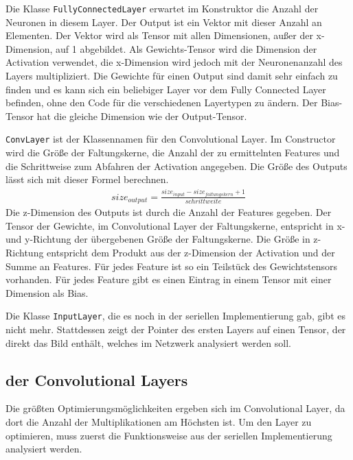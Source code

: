 \documentclass[../main.tex]{subfiles}
\begin{document}
Die Klasse \texttt{FullyConnectedLayer} erwartet im Konstruktor die Anzahl der Neuronen in diesem Layer. Der Output ist ein Vektor mit dieser Anzahl an Elementen. Der Vektor wird als Tensor mit allen Dimensionen, außer der x-Dimension, auf 1 abgebildet. Als Gewichts-Tensor wird die Dimension der Activation verwendet, die x-Dimension wird jedoch mit der Neuronenanzahl des Layers multipliziert. Die Gewichte für einen Output sind damit sehr einfach zu finden und es kann sich ein beliebiger Layer vor dem Fully Connected Layer befinden, ohne den Code für die verschiedenen Layertypen zu ändern. Der Bias-Tensor hat die gleiche Dimension wie der Output-Tensor.

\texttt{ConvLayer} ist der Klassennamen für den Convolutional Layer. Im Constructor wird die Größe der Faltungskerne, die Anzahl der zu ermittelnten Features und die Schrittweise zum Abfahren der Activation angegeben. Die Größe des Outputs lässt sich mit dieser Formel berechnen.
\begin{equation}\label{eq:cnn_outout_size}
\begin{split}
size_{output} = \frac{size_{input} -size_{faltungskern} +1}{schrittweite}
\end{split}
\end{equation}
Die z-Dimension des Outputs ist durch die Anzahl der Features gegeben. Der Tensor der Gewichte, im Convolutional Layer der Faltungskerne, entspricht in x- und y-Richtung der übergebenen Größe der Faltungskerne. Die Größe in z-Richtung entspricht dem Produkt aus der z-Dimension der Activation und der Summe an Features. Für jedes Feature ist so ein Teilstück des Gewichtstensors vorhanden. Für jedes Feature gibt es einen Eintrag in einem Tensor mit einer Dimension als Bias.

Die Klasse \texttt{InputLayer}, die es noch in der seriellen Implementierung gab, gibt es nicht mehr. Stattdessen zeigt der Pointer des ersten Layers auf einen Tensor, der direkt das Bild enthält, welches im Netzwerk analysiert werden soll.

\subsection{der Convolutional Layers}

Die größten Optimierungsmöglichkeiten ergeben sich im Convolutional Layer, da dort die Anzahl der Multiplikationen am Höchsten ist. Um den Layer zu optimieren, muss zuerst die Funktionsweise aus der seriellen Implementierung analysiert werden.
\end{document}
